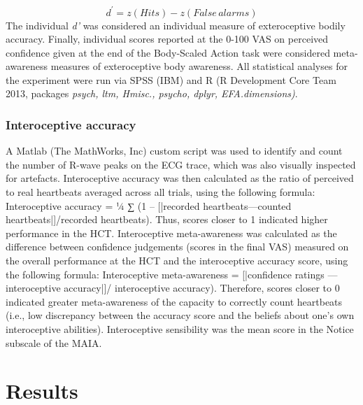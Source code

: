 \documentclass[man]{apa7}
\begin{document}
 \[ d^{\prime} = z(Hits) - z(False \, alarms)\]
 The individual \emph{d’} was considered an individual measure of exteroceptive bodily accuracy. Finally, individual scores reported at the 0-100 VAS on perceived confidence given at the end of the Body-Scaled Action task were considered meta-awareness measures of exteroceptive body awareness. All statistical analyses for the experiment were run via SPSS (IBM) and R (R Development Core Team 2013, packages \emph{psych, ltm, Hmisc., psycho, dplyr, EFA.dimensions)}.
 \subsubsection{Interoceptive accuracy}
A Matlab (The MathWorks, Inc) custom script was used to identify and count the number of R-wave peaks on the ECG trace, which was also visually inspected for artefacts. Interoceptive accuracy was then calculated as the ratio of perceived to real heartbeats averaged across all trials, using the following formula: 
Interoceptive accuracy = ¼ ∑ (1 – [|recorded heartbeats—counted heartbeats|]/recorded heartbeats). 
Thus, scores closer to 1 indicated higher performance in the HCT. 
Interoceptive meta-awareness was calculated as the difference between confidence judgements (scores in the final VAS) measured on the overall performance at the HCT and the interoceptive accuracy score, using the following formula:
Interoceptive meta-awareness = [|confidence ratings — interoceptive accuracy|]/ interoceptive accuracy). 
Therefore, scores closer to 0 indicated greater meta-awareness of the capacity to correctly count heartbeats (i.e., low discrepancy between the accuracy score and the beliefs about one’s own interoceptive abilities). 
	Interoceptive sensibility was the mean score in the Notice subscale of the MAIA.


\section{Results}
\end{document}
